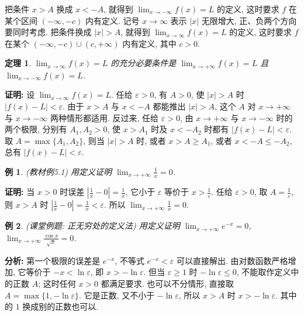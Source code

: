 \documentclass[UTF8,openany]{ctexbook}
\theoremstyle{chinesetextbook}
\newtheorem{example}{例}[section]
\newtheorem{theorem}{定理}[section]
\newenvironment{cnproof}{\par\indent\textbf{证明:} \ignorespaces}{\par}
\begin{document}
把条件 $x>A$ 换成 $x<-A$, 就得到 $\displaystyle\lim_{x\to-\infty}f(x)=L$ 的定义, 这时要求 $f$ 在某个区间 $(-\infty,-c)$ 内有定义. 记号 $x\to\infty$ 表示 $|x|$ 无限增大, 正、负两个方向要同时考虑. 把条件换成 $|x|>A$, 就得到 $\displaystyle\lim_{x\to\infty}f(x)=L$ 的定义, 这时要求 $f$ 在某个 $(-\infty,-c)\cup(c,+\infty)$ 内有定义, 其中 $c>0$.
\begin{theorem}
$\displaystyle\lim_{x\to\infty}f(x)=L$ 的充分必要条件是 $\displaystyle\lim_{x\to+\infty}f(x)=L$ 且 $\displaystyle\lim_{x\to-\infty}f(x)=L$.
\end{theorem}
\begin{cnproof}
设 $\displaystyle\lim_{x\to\infty}f(x)=L$. 任给 $\varepsilon>0$, 有 $A>0$, 使 $|x|>A$ 时 $|f(x)-L|<\varepsilon$. 由于 $x>A$ 与 $x<-A$ 都能推出 $|x|>A$, 这个 $A$ 对 $x\to+\infty$ 与 $x\to-\infty$ 两种情形都适用. 反过来, 任给 $\varepsilon>0$, 由 $x\to+\infty$ 与 $x\to-\infty$ 时的两个极限, 分别有 $A_1,A_2>0$, 使 $x>A_1$ 时及 $x<-A_2$ 时都有 $|f(x)-L|<\varepsilon$. 取 $A=\max\{A_1,A_2\}$, 则当 $|x|>A$ 时, 或者 $x>A\ge A_1$, 或者 $x<-A\le-A_2$, 总有 $|f(x)-L|<\varepsilon$.
\end{cnproof}
\begin{example}
\textnormal{(教材例5.1)} 用定义证明 $\displaystyle\lim_{x\to+\infty}\frac1x=0$.
\end{example}
\begin{cnproof}
当 $x>0$ 时误差 $\displaystyle\left|\frac1x-0\right|=\frac1x$, 它小于 $\varepsilon$ 等价于 $\displaystyle x>\frac1\varepsilon$. 任给 $\varepsilon>0$, 取 $\displaystyle A=\frac1\varepsilon$, 则 $x>A$ 时 $\displaystyle\left|\frac1x-0\right|=\frac1x<\varepsilon$. 所以 $\displaystyle\lim_{x\to+\infty}\frac1x=0$.
\end{cnproof}
\begin{example}
\textnormal{(课堂例题: 正无穷处的定义法)} 用定义证明 $\displaystyle\lim_{x\to+\infty}e^{-x}=0$, $\displaystyle\lim_{x\to+\infty}\frac{\cos x}{\sqrt x}=0$.
\end{example}
\par\indent\textbf{分析:} 第一个极限的误差是 $e^{-x}$, 不等式 $e^{-x}<\varepsilon$ 可以直接解出. 由对数函数严格增加, 它等价于 $-x<\ln\varepsilon$, 即 $x>-\ln\varepsilon$. 但当 $\varepsilon\ge1$ 时 $-\ln\varepsilon\le0$, 不能取作定义中的正数 $A$; 这时任何 $x>0$ 都满足要求. 也可以不分情形, 直接取 $A=\max\{1,-\ln\varepsilon\}$. 它是正数, 又不小于 $-\ln\varepsilon$, 所以 $x>A$ 时 $x>-\ln\varepsilon$. 其中的 $1$ 换成别的正数也可以.
\end{document}
